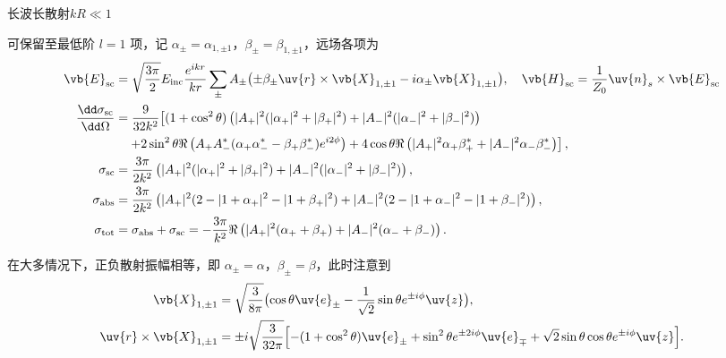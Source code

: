 \begin{exbox}
	长波长散射\(kR\ll1\)

	可保留至最低阶  \(l = 1\) 项，记
	\(\alpha_{\pm} = \alpha_{1,\pm1}\)，\(\beta_{\pm} = \beta_{1,\pm1}\)，远场各项为
	\begin{align*}
		\vb{E}_{\rm sc} & = \sqrt{\dfrac{3 \pi}{2}} E_{\rm inc} \dfrac{e^{ikr}}{kr} \sum\limits_{\pm}
		A_{\pm}\bigl(\pm \beta_{\pm}\uv{r}\times\vb{X}_{1,\pm1} -
		i\alpha_{\pm}\vb{X}_{1,\pm1}\bigr),\quad \vb{H}_{\rm sc}=\frac{1}{Z_0}\uv{n}_s\times\vb{E}_{\rm sc}                                                                                                      \\
		\frac{\dd \sigma_{\mathrm{sc}}}{\dd \Omega}
		                & = \frac{9}{32k^2}\!\left[(1+\cos^2\theta)\left(|A_+|^2(|\alpha_+|^2+|\beta_+|^2)+|A_-|^2(|\alpha_-|^2+|\beta_-|^2)\right)\right.                                                       \\
		                & \quad\left. +2\sin^2\theta\Re\left(A_+A_-^*(\alpha_+\alpha_-^*-\beta_+\beta_-^*)e^{i2\phi}\right)+4\cos\theta\Re\left(|A_+|^2\alpha_+\beta_+^*+|A_-|^2\alpha_-\beta_-^*\right)\right], \\
		\sigma_{\mathrm{sc}}
		                & = \frac{3\pi}{2k^2}\left(|A_+|^2(|\alpha_+|^2+|\beta_+|^2)+|A_-|^2(|\alpha_-|^2+|\beta_-|^2)\right),                                                                                   \\
		\sigma_{\mathrm{abs}}
		                & = \frac{3\pi}{2k^2}\left(|A_+|^2(2-|1+\alpha_+|^2-|1+\beta_+|^2)+|A_-|^2(2-|1+\alpha_-|^2-|1+\beta_-|^2)\right),                                                                       \\
		\sigma_{\mathrm{tot}}
		                & = \sigma_{\mathrm{abs}}+\sigma_{\mathrm{sc}}=-\frac{3\pi}{k^2}\Re\left(|A_+|^2(\alpha_++\beta_+)+|A_-|^2(\alpha_-+\beta_-)\right).
	\end{align*}

	在大多情况下，正负散射振幅相等，即
	\(\alpha_{\pm} = \alpha\)，\(\beta_{\pm} = \beta\)，此时注意到
	\begin{align*}
		\vb{X}_{1,\pm1} &= \sqrt{\dfrac{3}{8 \pi}} \bigl(\cos\theta \uv{e}_{\pm} -
		\dfrac{1}{\sqrt{2}} \sin\theta e^{\pm i\phi}\uv{z}\bigr),\\
		\uv{r}\times\vb{X}_{1,\pm1} &= \pm i \sqrt{\dfrac{3}{32 \pi}} \Bigl[-(1+\cos^2\theta)\uv{e}_{\pm} + \sin^2\theta e^{\pm 2i\phi}\uv{e}_{\mp} +
			\sqrt{2} \sin\theta \cos\theta e^{\pm i\phi}\uv{z}\Bigr].
	\end{align*}


\end{exbox}
